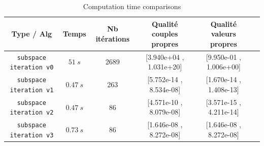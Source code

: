 \documentclass{article}
\begin{document}
\begin{table}[H]
    \centering
    \label{tab:vitesse-algos}
    \begin{tabular}{c|ccccc}
        Type / Alg & Temps & Nb itérations & Qualité couples propres & Qualité valeurs propres \\\hline
        \verb|subspace iteration v0| & $\SI{51}{s}$ & 2689 & [3.940e+04 , 1.031e+20] & [9.950e-01 , 1.006e+00] \\
        \verb|subspace iteration v1| & $\SI{0.47}{s}$ & 263 & [5.752e-14 , 8.534e-08] & [1.670e-14 , 1.408e-13] \\
        \verb|subspace iteration v2| & $\SI{0.47}{s}$ & 86 & [4.571e-10 , 8.079e-08] & [3.571e-15 , 4.211e-14] \\
        \verb|subspace iteration v3| & $\SI{0.73}{s}$ & 86 & [1.646e-08 , 8.272e-08] & [1.646e-08 , 8.272e-08] \\
    \end{tabular}
    \caption{Computation time comparisons}
\end{table}
\end{document}
